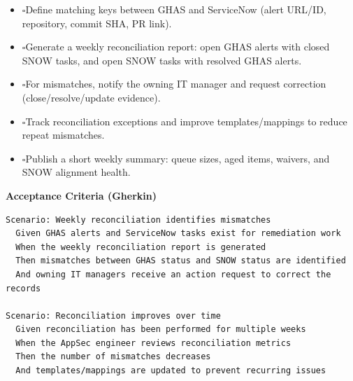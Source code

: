 \documentclass[11pt,a4paper]{article}
\newcommand{\checkbox}{\(\square\)}
\let\cb\checkbox
\newenvironment{TasksBox}[1][Tasks]{%
  \begin{tcolorbox}[
    enhanced,breakable,
    colback=gray!1, colframe=gray!35,
    colbacktitle=gray!6, coltitle=black,
    title={#1}, fonttitle=\bfseries,
    borderline west={1.8pt}{0pt}{MidnightBlue},
    arc=2pt, boxrule=0.4pt,
    left=10pt,right=10pt,top=6pt,bottom=6pt,
    before skip=6pt, after skip=10pt
  ]
  \small
  \begin{itemize}[label=\cb, leftmargin=*, labelsep=0.6em, itemsep=4pt, topsep=2pt, parsep=0pt]
}{%
  \end{itemize}
  \end{tcolorbox}
}
\begin{document}
\begin{TasksBox}[Implementation Tasks]
  \item \cb Define matching keys between GHAS and ServiceNow (alert URL/ID, repository, commit SHA, PR link).
  \item \cb Generate a weekly reconciliation report: open GHAS alerts with closed SNOW tasks, and open SNOW tasks with resolved GHAS alerts.
  \item \cb For mismatches, notify the owning IT manager and request correction (close/resolve/update evidence).
  \item \cb Track reconciliation exceptions and improve templates/mappings to reduce repeat mismatches.
  \item \cb Publish a short weekly summary: queue sizes, aged items, waivers, and SNOW alignment health.
\end{TasksBox}

\textbf{Acceptance Criteria (Gherkin)}
\begin{verbatim}
Scenario: Weekly reconciliation identifies mismatches
  Given GHAS alerts and ServiceNow tasks exist for remediation work
  When the weekly reconciliation report is generated
  Then mismatches between GHAS status and SNOW status are identified
  And owning IT managers receive an action request to correct the records

Scenario: Reconciliation improves over time
  Given reconciliation has been performed for multiple weeks
  When the AppSec engineer reviews reconciliation metrics
  Then the number of mismatches decreases
  And templates/mappings are updated to prevent recurring issues
\end{verbatim}

\clearpage
\end{document}
